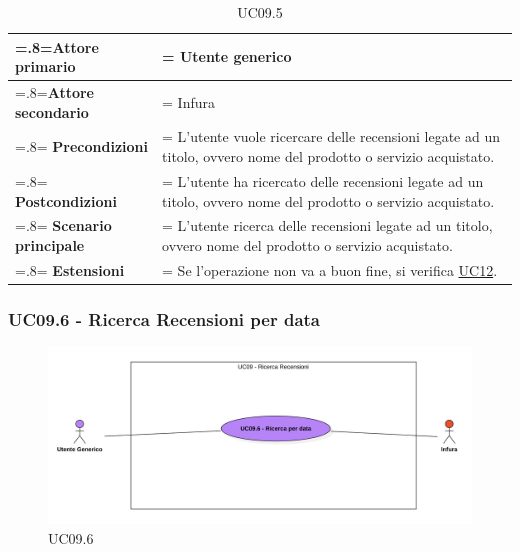             \begin{table}[H]
                \centering
                \renewcommand{\arraystretch}{1.8}
                \renewcommand\tabularxcolumn[1]{m{#1}}
                \begin{tabularx}{0.9\textwidth} {
                    >{\hsize=.8\hsize\linewidth=\hsize}X
                    >{\hsize=1.2\hsize\linewidth=\hsize}X}
                    \hline
                    \textbf{Attore primario} & Utente generico \\
                    \hline
                    \textbf{Attore secondario} & Infura \\
                    \hline
                    \textbf{Precondizioni} & L'utente vuole ricercare delle recensioni legate ad un titolo, ovvero nome del prodotto o servizio acquistato. \\
                    \hline
                    \textbf{Postcondizioni} & L'utente ha ricercato delle recensioni legate ad un titolo, ovvero nome del prodotto o servizio acquistato. \\
                    \hline
                    \textbf{Scenario principale} & L'utente ricerca delle recensioni legate ad un titolo, ovvero nome del prodotto o servizio acquistato.\\
                    \hline
                    \textbf{Estensioni} & Se l'operazione non va a buon fine, si verifica \hyperref[UC12]{UC12}. \\
                    \hline
                \end{tabularx}
                \caption{UC09.5}
            \end{table}

        \subsubsection{UC09.6 - Ricerca Recensioni per data}
        \label{UC09.6}

            \begin{figure}[H]
                \centering
                \includegraphics[scale=0.6]{src/img/UC09.6.png}
                \caption{UC09.6}
            \end{figure}

